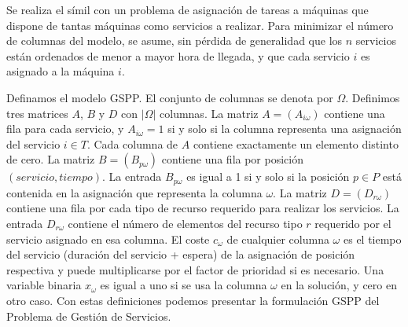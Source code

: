 Se realiza el símil con un problema de asignación de tareas a máquinas que dispone de tantas máquinas como servicios a realizar. Para minimizar el número de columnas del modelo, se asume, sin pérdida de generalidad que los $n$ servicios están ordenados de menor a mayor hora de llegada, y que cada servicio $i$ es asignado a la máquina $i$.




Definamos el modelo GSPP. El conjunto de columnas se denota por $\Omega$. Definimos tres matrices $A$, $B$ y $D$ con $|\Omega|$ columnas. La matriz $A = (A_{i\omega})$ contiene una fila para cada servicio, y $A_{i\omega} = 1$ si y solo si la columna representa una asignación del servicio $i \in T$. Cada columna de $A$ contiene exactamente un elemento distinto de cero. La matriz $B = (B_{p\omega})$ contiene una fila por posición $(servicio, tiempo)$. La entrada $B_{p\omega}$ es igual a 1 si y solo si la posición $p \in P$ está contenida en la asignación que representa la columna $\omega$. La matriz $D = (D_{r\omega})$ contiene una fila por cada tipo de recurso requerido para realizar los servicios. La entrada $D_{r\omega}$ contiene el número de elementos del recurso tipo $r$ requerido por el servicio asignado en esa columna. El coste $c_{\omega}$ de cualquier columna $\omega$ es el tiempo del servicio (duración del servicio + espera) de la asignación de posición respectiva y puede multiplicarse por el factor de prioridad si es necesario. Una variable binaria $x_{\omega}$ es igual a uno si se usa la  columna $\omega$ en la solución, y cero en otro caso. Con estas definiciones podemos presentar la formulación GSPP del Problema de Gestión de Servicios.

